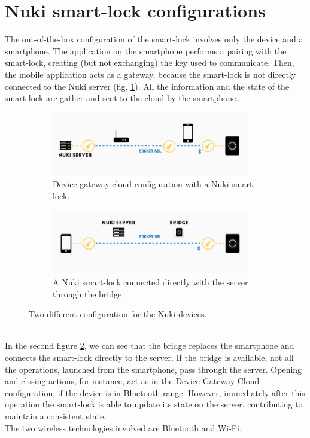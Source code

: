 \section{Nuki smart-lock configurations}
The out-of-the-box configuration of the smart-lock involves only the device and a smartphone. The application on the smartphone performs a pairing with the smart-lock, creating (but not exchanging) the key used to communicate. Then, the mobile application acts as a gateway, because the smart-lock is not directly connected to the Nuki server (fig. \ref{fig:dgcnuki}). All the information and the state of the smart-lock are gather and sent to the cloud by the smartphone. 
\begin{figure}[ht]
     \centering
     \captionsetup[subfigure]{justification=centering}
     \begin{subfigure}[b]{0.95\textwidth}
         \centering
         \includegraphics[width=0.95\textwidth, frame]{figures/dgc-nuki.png}
         \caption{Device-gateway-cloud configuration with a Nuki smart-lock.}
         \label{fig:dgcnuki}
     \end{subfigure}
     \par\bigskip
     \begin{subfigure}[b]{0.95\textwidth}
         \centering
         \includegraphics[width=0.95\textwidth, frame]{figures/nuki-bridgedconf.png}
         \caption{A Nuki smart-lock connected directly with the server through the bridge.}
         \label{fig:nukibridgedconf}
     \end{subfigure}
    \caption{Two different configuration for the Nuki devices.}
    \label{fig:nukiconf}
\end{figure}
\\ In the second figure \ref{fig:nukibridgedconf}, we can see that the bridge replaces the smartphone and connects the smart-lock directly to the server. If the bridge is available, not all the operations, launched from the smartphone, pass through the server. Opening and closing actions, for instance, act as in the Device-Gateway-Cloud configuration, if the device is in Bluetooth range. However, immediately after this operation the smart-lock is able to update its state on the server, contributing to maintain a consistent state. 
\\ The two wireless technologies involved are Bluetooth and Wi-Fi. 
